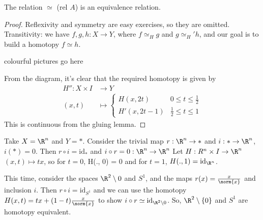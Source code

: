 \documentclass{article}
\newcommand{\id}{\mathrm{id}}
\numberwithin{nthm}{subsection}
\begin{document}

\begin{nprop}
    The relation $\simeq$  (rel $A$) is an equivalence relation.
\end{nprop}

\begin{proof}
    Reflexivity and symmetry are easy exercises, so they are omitted.  Transitivity: we have $f, g, h: X \to Y$, where $f \simeq_H g$ and $g \simeq_H' h$, and our goal is to build a homotopy $f \simeq h$.

    colourful pictures go here

    From the diagram, it's clear that the required homotopy is given by
    \begin{align*}
        H'' : X \times I &\to Y \\
        (x, t) &\mapsto
        \begin{cases}
            H(x, 2t) & 0 \leq t \leq \frac12 \\
            H'(x, 2t-1) & \frac12 \leq t \leq 1
        \end{cases}
    \end{align*}
    This is continuous from the gluing lemma.
\end{proof}


\begin{eg}
    Take $X = \R^n$ and $Y = *$. Consider the trivial map $r: \R^n \to *$ and $i: * \to \R^n$, $i(*) = 0$. Then $r \circ i = \id_*$ and $i \circ r = 0: \R^n \to \R^n$
    Let $H: R^n \times I \to \R^n$ $(x, t) \mapsto tx$, so for $t=0$, H(., 0) = 0 and for $t=1$, $H(., 1) = \id_{\R^n}$.
\end{eg}

\begin{eg}
    This time, consider the spaces $\R^2 \setminus {0}$ and $S^1$, and the maps $r(x) = \frac{x}{\norm{x}}$  and inclusion $i$.  Then $r \circ i = \id_{S^1}$ and we can use the homotopy $H(x, t) = tx + (1-t) \frac{x}{\norm{x}}$ to show $i \circ r \simeq \id_{\R^2 \setminus {0}}$.  So, $\R^2 \setminus \{0\}$ and $S^1$ are homotopy equivalent.
\end{eg}
\end{document}
